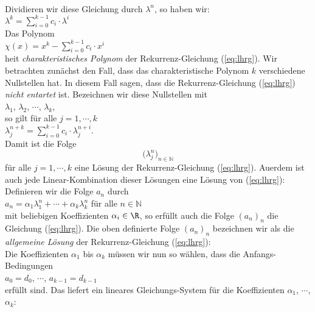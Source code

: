 \\[0.1cm]
Dividieren wir diese Gleichung durch $\lambda^n$, so haben wir: \\[0.1cm]
\hspace*{1.3cm} $\lambda^{k} = \sum\limits_{i=0}^{k-1} c_i \cdot \lambda^{i}$  
\\[0.1cm]
Das Polynom \\[0.1cm]
\hspace*{1.3cm} 
$\chi(x) = x^{k} - \sum\limits_{i=0}^{k-1} c_i \cdot x^{i}$  
\\[0.1cm]
 hei\3t \emph{charakteristisches Polynom} der Rekurrenz-Gleichung (\ref{eq:lhrg}).
Wir betrachten zun\"achst den Fall, dass das charakteristische  Polynom  $k$  verschiedene
Nullstellen hat.  In diesem Fall sagen, dass die Rekurrenz-Gleichung (\ref{eq:lhrg}) 
\emph{nicht entartet} ist.
Bezeichnen wir diese Nullstellen mit \\[0.1cm]
\hspace*{1.3cm}  $\lambda_1$, $\lambda_2$, $\cdots$, $\lambda_k$, \\[0.1cm]
so  gilt f\"ur alle $j = 1,\cdots, k$ \\[0.1cm]
\hspace*{1.3cm} 
$\lambda_j^{n+k} = \sum\limits_{i=0}^{k-1} c_i \cdot \lambda_j^{n+i}$.
\\[0.1cm]
Damit ist die Folge  
\[\bigl(\lambda_j^n)_{n\in\mathbb{N}}\]
f\"ur alle $j=1,\cdots,k$ eine L\"osung der Rekurrenz-Gleichung (\ref{eq:lhrg}).
Au\3erdem ist auch jede Linear-Kombination dieser L\"osungen eine L\"osung von (\ref{eq:lhrg}):
Definieren wir die Folge $a_n$ durch \\[0.1cm]
\hspace*{1.3cm} $a_n = \alpha_1 \lambda_1^n + \cdots + \alpha_k \lambda_k^n$ \quad f\"ur alle $n \in \mathbb{N}$ \\[0.1cm]
mit beliebigen Koeffizienten $\alpha_i \in \R$, so erf\"ullt auch die Folge
$(a_n)_n$ die Gleichung (\ref{eq:lhrg}).  Die oben definierte Folge $(a_n)_n$ bezeichnen wir als
die  \emph{allgemeine L\"osung} der Rekurrenz-Gleichung (\ref{eq:lhrg}): \\[0.1cm]
Die Koeffizienten $\alpha_1$ bis $\alpha_k$ m\"ussen wir nun so w\"ahlen, dass die
Anfangs-Bedingungen 
\\[0.2cm]
\hspace*{1.3cm}
$a_0 = d_0$, $\cdots$, $a_{k-1} = d_{k-1}$
\\[0.2cm]
erf\"ullt sind.  Das liefert ein lineares Gleichungs-System f\"ur die Koeffizienten $\alpha_1$, $\cdots$, $\alpha_k$:
